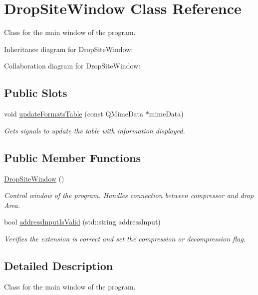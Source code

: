 \hypertarget{classDropSiteWindow}{}\section{Drop\+Site\+Window Class Reference}
\label{classDropSiteWindow}


Class for the main window of the program.  




Inheritance diagram for Drop\+Site\+Window\+:


Collaboration diagram for Drop\+Site\+Window\+:
\subsection*{Public Slots}
\begin{DoxyCompactItemize}
\item 
void \hyperlink{classDropSiteWindow_a76f392c9ae2dabdbe1e47a0a473bed8b}{update\+Formats\+Table} (const Q\+Mime\+Data $\ast$mime\+Data)
\begin{DoxyCompactList}\small\item\em Gets signals to update the table with information displayed. \end{DoxyCompactList}\end{DoxyCompactItemize}
\subsection*{Public Member Functions}
\begin{DoxyCompactItemize}
\item 
\hyperlink{classDropSiteWindow_a46689da5d5284b0c22ad4911e6b9ad54}{Drop\+Site\+Window} ()
\begin{DoxyCompactList}\small\item\em Control window of the program. Handles connection between compressor and drop Area. \end{DoxyCompactList}\item 
bool \hyperlink{classDropSiteWindow_a5d1aa8eb4e8381842a96baa14ef2f3ad}{address\+Input\+Is\+Valid} (std\+::string address\+Input)
\begin{DoxyCompactList}\small\item\em Verifies the extension is correct and set the compression or decompression flag. \end{DoxyCompactList}\end{DoxyCompactItemize}


\subsection{Detailed Description}
Class for the main window of the program. 


